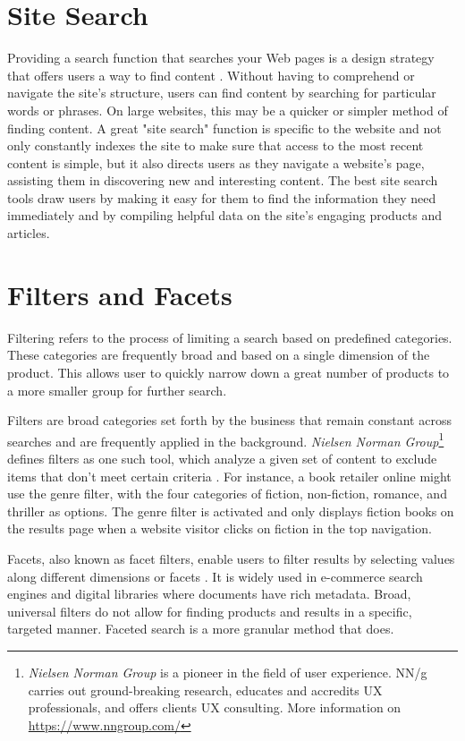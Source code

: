\section{Site Search}
Providing a search function that searches your Web pages is a design strategy that offers users a way to find content \autocite{w3c2016search}. Without having to comprehend or navigate the site's structure, users can find content by searching for particular words or phrases. On large websites, this may be a quicker or simpler method of finding content. A great "site search" function is specific to the website and not only constantly indexes the site to make sure that access to the most recent content is simple, but it also directs users as they navigate a website's page, assisting them in discovering new and interesting content. The best site search tools draw users by making it easy for them to find the information they need immediately and by compiling helpful data on the site's engaging products and articles.


\section{Filters and Facets}
\label{filters_and_facets}
Filtering refers to the process of limiting a search based on predefined categories. These categories are frequently broad and based on a single dimension of the product. This allows user to quickly narrow down a great number of products to a more smaller group for further search.

Filters are broad categories set forth by the business that remain constant across searches and are frequently applied in the background. \emph{Nielsen Norman Group}\footnote{\emph{Nielsen Norman Group} is a pioneer in the field of user experience. NN/g carries out ground-breaking research, educates and accredits UX professionals, and offers clients UX consulting. More information on \url{https://www.nngroup.com/}} defines filters as one such tool, which analyze a given set of content to exclude items that don't meet certain criteria \autocite{whitenton2014filters}. For instance, a book retailer online might use the genre filter, with the four categories of fiction, non-fiction, romance, and thriller as options. The genre filter is activated and only displays fiction books on the results page when a website visitor clicks on fiction in the top navigation.

Facets, also known as facet filters, enable users to filter results by selecting values along different dimensions or facets \autocite{qu2021study}. It is widely used in e-commerce search engines and digital libraries where documents have rich metadata. Broad, universal filters do not allow for finding products and results in a specific, targeted manner. Faceted search is a more granular method that does.

